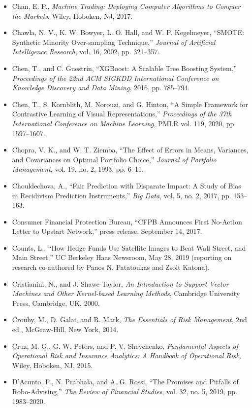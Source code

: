 \documentclass{book}
\begin{document}
\begin{itemize}
    \item Chan, E. P., \emph{Machine Trading: Deploying Computer Algorithms to Conquer the Markets}, Wiley, Hoboken, NJ, 2017.
    \item Chawla, N. V., K. W. Bowyer, L. O. Hall, and W. P. Kegelmeyer, ``SMOTE: Synthetic Minority Over-sampling Technique,'' \emph{Journal of Artificial Intelligence Research}, vol. 16, 2002, pp. 321--357.
    \item Chen, T., and C. Guestrin, ``XGBoost: A Scalable Tree Boosting System,'' \emph{Proceedings of the 22nd ACM SIGKDD International Conference on Knowledge Discovery and Data Mining}, 2016, pp. 785--794.
    \item Chen, T., S. Kornblith, M. Norouzi, and G. Hinton, ``A Simple Framework for Contrastive Learning of Visual Representations,'' \emph{Proceedings of the 37th International Conference on Machine Learning}, PMLR vol. 119, 2020, pp. 1597--1607.
    \item Chopra, V. K., and W. T. Ziemba, ``The Effect of Errors in Means, Variances, and Covariances on Optimal Portfolio Choice,'' \emph{Journal of Portfolio Management}, vol. 19, no. 2, 1993, pp. 6--11.
    \item Chouldechova, A., ``Fair Prediction with Disparate Impact: A Study of Bias in Recidivism Prediction Instruments,'' \emph{Big Data}, vol. 5, no. 2, 2017, pp. 153--163.
    \item Consumer Financial Protection Bureau, ``CFPB Announces First No-Action Letter to Upstart Network,'' press release, September 14, 2017.
    \item Counts, L., ``How Hedge Funds Use Satellite Images to Beat Wall Street, and Main Street,'' UC Berkeley Haas Newsroom, May 28, 2019 (reporting on research co-authored by Panos N. Patatoukas and Zsolt Katona).
    \item Cristianini, N., and J. Shawe-Taylor, \emph{An Introduction to Support Vector Machines and Other Kernel-based Learning Methods}, Cambridge University Press, Cambridge, UK, 2000.
    \item Crouhy, M., D. Galai, and R. Mark, \emph{The Essentials of Risk Management}, 2nd ed., McGraw-Hill, New York, 2014.
    \item Cruz, M. G., G. W. Peters, and P. V. Shevchenko, \emph{Fundamental Aspects of Operational Risk and Insurance Analytics: A Handbook of Operational Risk}, Wiley, Hoboken, NJ, 2015.
    \item D'Acunto, F., N. Prabhala, and A. G. Rossi, ``The Promises and Pitfalls of Robo-Advising,'' \emph{The Review of Financial Studies}, vol. 32, no. 5, 2019, pp. 1983--2020.

\end{itemize}
\end{document}
